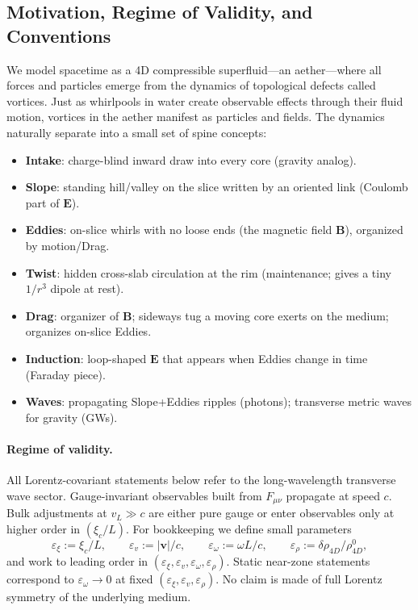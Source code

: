 \subsection{Motivation, Regime of Validity, and Conventions}
\label{sec:motivation-conventions}

We model spacetime as a 4D compressible superfluid---an aether---where all forces and particles emerge from the dynamics of topological defects called vortices. Just as whirlpools in water create observable effects through their fluid motion, vortices in the aether manifest as particles and fields. The dynamics naturally separate into a small set of spine concepts:
\begin{itemize}
  \item \textbf{Intake}: charge-blind inward draw into every core (gravity analog).
  \item \textbf{Slope}: standing hill/valley on the slice written by an oriented link (Coulomb part of $\mathbf E$).
  \item \textbf{Eddies}: on-slice whirls with no loose ends (the magnetic field $\mathbf B$), organized by motion/Drag.
  \item \textbf{Twist}: hidden cross-slab circulation at the rim (maintenance; gives a tiny $1/r^3$ dipole at rest).
  \item \textbf{Drag}: organizer of $\mathbf B$; sideways tug a moving core exerts on the medium; organizes on-slice Eddies.
  \item \textbf{Induction}: loop-shaped $\mathbf E$ that appears when Eddies change in time (Faraday piece).
  \item \textbf{Waves}: propagating Slope+Eddies ripples (photons); transverse metric waves for gravity (GWs).
\end{itemize}
\paragraph{Regime of validity.} All Lorentz-covariant statements below refer to the long-wavelength transverse wave sector. Gauge-invariant observables built from $F_{\mu\nu}$ propagate at speed $c$. Bulk adjustments at $v_L\gg c$ are either pure gauge or enter observables only at higher order in $(\xi_c/L)$. For bookkeeping we define small parameters
\[
\varepsilon_\xi:=\xi_c/L,\qquad
\varepsilon_v:=|\mathbf v|/c,\qquad
\varepsilon_\omega:=\omega L/c,\qquad
\varepsilon_\rho:=\delta\rho_{4D}/\rho_{4D}^0,
\]
and work to leading order in $(\varepsilon_\xi,\varepsilon_v,\varepsilon_\omega,\varepsilon_\rho)$. Static near-zone statements correspond to $\varepsilon_\omega\to0$ at fixed $(\varepsilon_\xi,\varepsilon_v,\varepsilon_\rho)$. No claim is made of full Lorentz symmetry of the underlying medium.

